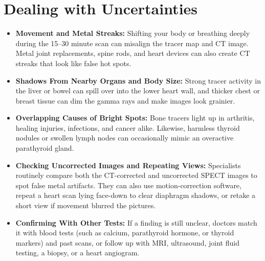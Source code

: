 \section{Dealing with Uncertainties}
\begin{itemize}
    \item \textbf{Movement and Metal Streaks:} Shifting your body or breathing deeply during the 15--30 minute scan can misalign the tracer map and CT image. Metal joint replacements, spine rods, and heart devices can also create CT streaks that look like false hot spots.
    \item \textbf{Shadows From Nearby Organs and Body Size:} Strong tracer activity in the liver or bowel can spill over into the lower heart wall, and thicker chest or breast tissue can dim the gamma rays and make images look grainier.
    \item \textbf{Overlapping Causes of Bright Spots:} Bone tracers light up in arthritis, healing injuries, infections, and cancer alike. Likewise, harmless thyroid nodules or swollen lymph nodes can occasionally mimic an overactive parathyroid gland.
    \item \textbf{Checking Uncorrected Images and Repeating Views:} Specialists routinely compare both the CT-corrected and uncorrected SPECT images to spot false metal artifacts. They can also use motion-correction software, repeat a heart scan lying face-down to clear diaphragm shadows, or retake a short view if movement blurred the pictures.
    \item \textbf{Confirming With Other Tests:} If a finding is still unclear, doctors match it with blood tests (such as calcium, parathyroid hormone, or thyroid markers) and past scans, or follow up with MRI, ultrasound, joint fluid testing, a biopsy, or a heart angiogram.
\end{itemize}

